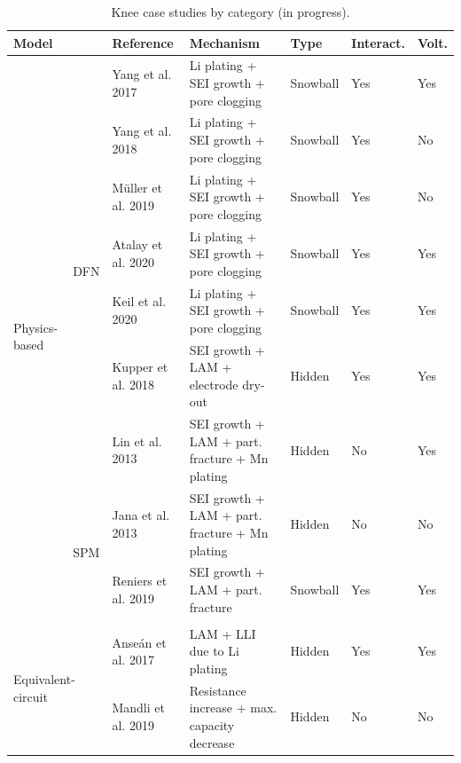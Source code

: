\documentclass[journal=jpclcd,manuscript=article]{achemso}
\begin{document}
\begin{landscape}

\begin{table}
    \caption{Knee case studies by category (in progress).}
    \label{table:expt_summary}
    \centering
    \small
    \begin{tabular}{|l|l|l|l|l|l|l|}
    \hline
        \multicolumn{2}{|l|}{\textbf{Model}} & \textbf{Reference} & \textbf{Mechanism} & \textbf{Type} & \textbf{Interact.} & \textbf{Volt.} \\ \hline
        \multirow{9}{*}{Physics-based} & \multirow{7}{*}{DFN} & Yang et al. 2017 \cite{yang_modeling_2017} & Li plating + SEI growth + pore clogging & Snowball & Yes & Yes \\ \cline{3-7}
         & & Yang et al. 2018 \cite{yang_understanding_2018} & Li plating + SEI growth + pore clogging & Snowball & Yes & No \\ \cline{3-7}
         & & Müller et al. 2019 \cite{muller_model-based_2019} & Li plating + SEI growth + pore clogging & Snowball & Yes & No \\ \cline{3-7}
         & & Atalay et al. 2020 \cite{atalay_theory_2020} & Li plating + SEI growth + pore clogging & Snowball & Yes & Yes \\ \cline{3-7}
         & & Keil et al. 2020 \cite{keil_electrochemical_2020} & Li plating + SEI growth + pore clogging & Snowball & Yes & Yes \\ \cline{3-7}
         & & Kupper et al. 2018 \cite{kupper_end--life_2018} & SEI growth + LAM + electrode dry-out & Hidden & Yes & Yes \\ \cline{3-7}
         & & Lin et al. 2013 \cite{lin_comprehensive_2013} & SEI growth + LAM + part. fracture + Mn plating & Hidden & No & Yes \\ \cline{2-7}
         & \multirow{2}{*}{SPM} & Jana et al. 2013 \cite{jana_physical_2019} & SEI growth + LAM + part. fracture + Mn plating & Hidden & No & No \\ \cline{3-7}
         & & Reniers et al. 2019 \cite{reniers_review_2019} & SEI growth + LAM + part. fracture & Snowball & Yes & Yes \\ \hline
        \multicolumn{7}{c}{}  \\ \hline
        \multicolumn{2}{|l|}{\multirow{2}{*}{Equivalent-circuit}} & Anseán et al. 2017 \cite{ansean_operando_2017} & LAM + LLI due to Li plating & Hidden & Yes & Yes \\ \cline{3-7}
        \multicolumn{2}{|l|}{} & Mandli et al. 2019 \cite{mandli_analysis_2019} & Resistance increase + max. capacity decrease & Hidden & No & No \\ \hline

\end{tabular}
\end{table}
\end{landscape}
\end{document}

